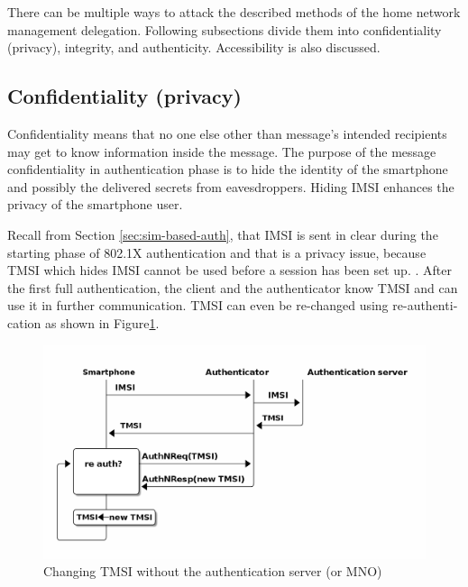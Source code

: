 \documentclass[12pt,a4paper,english]{tutthesis}
\begin{document}
\begin{otherlanguage}{english}
There can be multiple ways to attack the described methods of
the home network management delegation. Following subsections divide them into
confidentiality (privacy), integrity, and
authenticity. Accessibility is also discussed.
\subsection{Confidentiality (privacy)}
\label{sec-6-1-1}

Confidentiality means that no one else other than message's intended
recipients may get to know information inside the message.
The purpose of the message confidentiality in authentication phase is
to hide the identity of the smartphone and possibly the delivered
secrets from eavesdroppers. Hiding IMSI enhances the privacy of the smartphone user. 


Recall from Section \ref{sec:sim-based-auth}, that IMSI is sent in clear 
during the starting phase of 802.1X authentication and that is a privacy 
issue, because TMSI which hides IMSI cannot be used before a session
has been set up. \cite[p.66]{rfc4186}.
After the first full authentication, the client and the authenticator 
know TMSI and can use it in further communication. 
TMSI can even be re-changed using re-authentication as shown in Figure\ref{fig:tmsi}.

\begin{figure}[htb]
\centering
\includegraphics[width=.9\linewidth]{imsi-tmsi.png}
\caption{\label{fig:tmsi}Changing TMSI without the authentication server (or MNO)}
\end{figure}





\end{otherlanguage}
\end{document}
